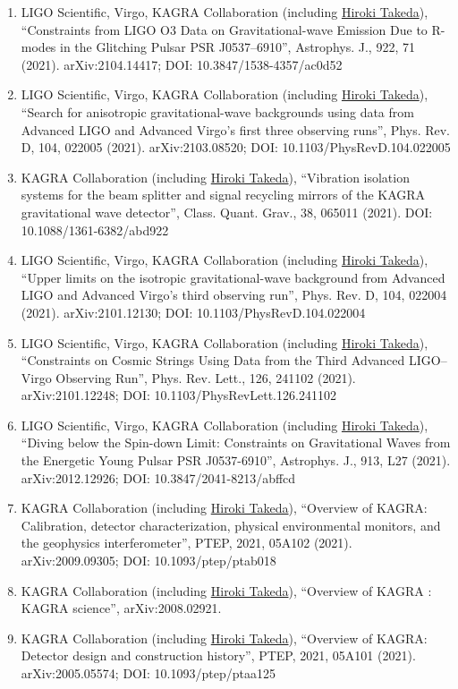 \documentclass[uplatex, 11pt]{jsarticle}
\begin{document}
\begin{enumerate}
\item LIGO Scientific, Virgo, KAGRA Collaboration (including \uline{Hiroki Takeda}), “Constraints from LIGO O3 Data on Gravitational-wave Emission Due to R-modes in the Glitching Pulsar PSR J0537--6910”, Astrophys. J., 922, 71 (2021). arXiv:2104.14417; DOI: 10.3847/1538-4357/ac0d52
\item LIGO Scientific, Virgo, KAGRA Collaboration (including \uline{Hiroki Takeda}), “Search for anisotropic gravitational-wave backgrounds using data from Advanced LIGO and Advanced Virgo's first three observing runs”, Phys. Rev. D, 104, 022005 (2021). arXiv:2103.08520; DOI: 10.1103/PhysRevD.104.022005
\item KAGRA Collaboration (including \uline{Hiroki Takeda}), “Vibration isolation systems for the beam splitter and signal recycling mirrors of the KAGRA gravitational wave detector”, Class. Quant. Grav., 38, 065011 (2021). DOI: 10.1088/1361-6382/abd922
\item LIGO Scientific, Virgo, KAGRA Collaboration (including \uline{Hiroki Takeda}), “Upper limits on the isotropic gravitational-wave background from Advanced LIGO and Advanced Virgo's third observing run”, Phys. Rev. D, 104, 022004 (2021). arXiv:2101.12130; DOI: 10.1103/PhysRevD.104.022004
\item LIGO Scientific, Virgo, KAGRA Collaboration (including \uline{Hiroki Takeda}), “Constraints on Cosmic Strings Using Data from the Third Advanced LIGO--Virgo Observing Run”, Phys. Rev. Lett., 126, 241102 (2021). arXiv:2101.12248; DOI: 10.1103/PhysRevLett.126.241102
\item LIGO Scientific, Virgo, KAGRA Collaboration (including \uline{Hiroki Takeda}), “Diving below the Spin-down Limit: Constraints on Gravitational Waves from the Energetic Young Pulsar PSR J0537-6910”, Astrophys. J., 913, L27 (2021). arXiv:2012.12926; DOI: 10.3847/2041-8213/abffcd
\item KAGRA Collaboration (including \uline{Hiroki Takeda}), “Overview of KAGRA: Calibration, detector characterization, physical environmental monitors, and the geophysics interferometer”, PTEP, 2021, 05A102 (2021). arXiv:2009.09305; DOI: 10.1093/ptep/ptab018
\item KAGRA Collaboration (including \uline{Hiroki Takeda}), “Overview of KAGRA : KAGRA science”, arXiv:2008.02921.
\item KAGRA Collaboration (including \uline{Hiroki Takeda}), “Overview of KAGRA: Detector design and construction history”, PTEP, 2021, 05A101 (2021). arXiv:2005.05574; DOI: 10.1093/ptep/ptaa125

\end{enumerate}
\end{document}
